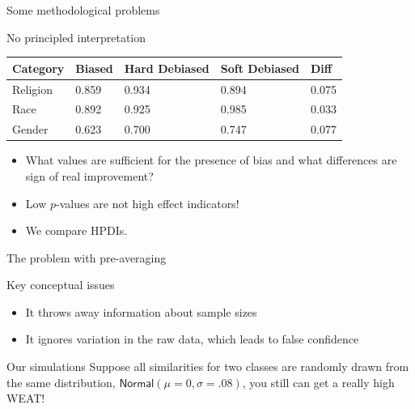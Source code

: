 \documentclass[
  10pt,
  ignorenonframetext,
  x11names, dvipsnames, bibspacing,natbib, table]{beamer}
\providecommand{\tightlist}{%
  \setlength{\itemsep}{0pt}\setlength{\parskip}{0pt}}
\begin{document}
\begin{frame}{Some methodological problems}
\protect\hypertarget{some-methodological-problems-6}{}
\begin{block}{No principled interpretation}
\protect\hypertarget{no-principled-interpretation}{}
\begin{longtable}[]{@{}lllll@{}}
\toprule
Category & Biased & Hard Debiased & Soft Debiased & Diff \\
\midrule
\endhead
Religion & 0.859 & 0.934 & 0.894 & 0.075 \\
Race & 0.892 & 0.925 & 0.985 & 0.033 \\
Gender & 0.623 & 0.700 & 0.747 & 0.077 \\
\bottomrule
\end{longtable}

\begin{itemize}
\item
  What values are sufficient for the presence of bias and what
  differences are sign of real improvement?
\item
  Low \(p\)-values are not high effect indicators!
\item
  We compare HPDIs.
\end{itemize}
\end{block}
\end{frame}

\begin{frame}{The problem with pre-averaging}
\protect\hypertarget{the-problem-with-pre-averaging}{}
\begin{block}{Key conceptual issues}
\protect\hypertarget{key-conceptual-issues}{}
\begin{itemize}
\tightlist
\item
  It throws away information about sample sizes
\item
  It ignores variation in the raw data, which leads to false confidence
\end{itemize}

\pause
\end{block}

\begin{block}{Our simulations}
\protect\hypertarget{our-simulations}{}
Suppose all similarities for two classes are randomly drawn from the
same distribution, \(\mathsf{Normal}(\mu = 0, \sigma = .08)\), you still
can get a really high WEAT!
\end{block}
\end{frame}
\end{document}
